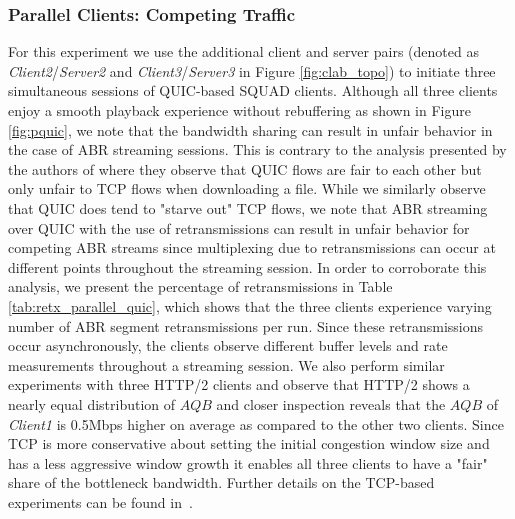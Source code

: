 \subsubsection{Parallel Clients: Competing Traffic}
For this experiment we use the additional client and server pairs (denoted as \textit{Client2}/\textit{Server2} and \textit{Client3}/\textit{Server3} in Figure \ref{fig:clab_topo}) to initiate three simultaneous sessions of QUIC-based SQUAD clients. Although all three clients enjoy a smooth playback experience without rebuffering as shown in Figure \ref{fig:pquic}, we note that the bandwidth sharing can result in unfair behavior in the case of ABR streaming sessions. This is contrary to the analysis presented by the authors of \cite{Kakhki:IMC:2017} where they observe that QUIC flows are fair to each other but only unfair to TCP flows when downloading a file. While we similarly observe that QUIC does tend to "starve out" TCP flows, we note that ABR streaming over QUIC with the use of retransmissions can result in unfair behavior for competing ABR streams since multiplexing due to retransmissions can occur at different points throughout the streaming session. In order to corroborate this analysis, we present the percentage of retransmissions in Table \ref{tab:retx_parallel_quic}, which shows that the three clients experience varying number of ABR segment retransmissions per run. Since these retransmissions occur asynchronously, the clients observe different buffer levels and rate measurements throughout a streaming session. We also perform similar experiments with three HTTP/2 clients and observe that HTTP/2 shows a nearly equal distribution of $AQB$ and closer inspection reveals that the $AQB$ of \textit{Client1} is 0.5Mbps higher on average as compared to the other two clients. Since TCP is more conservative about setting the initial congestion window size and has a less aggressive window growth it enables all three clients to have a "fair" share of the bottleneck bandwidth. Further details on the TCP-based experiments can be found in~\cite{QUIC_TR:2018}.
